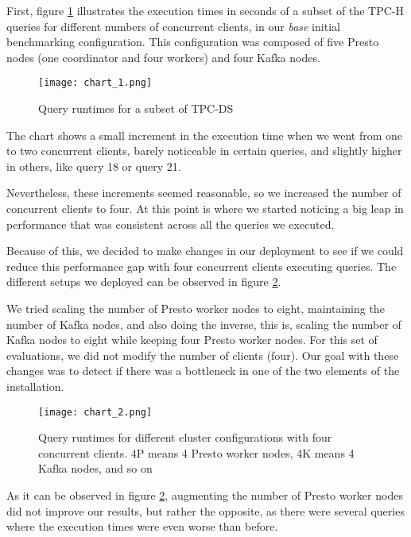 \documentclass[conference]{IEEEtran}
\begin{document}
First, figure \ref{chart_1} illustrates the execution times in seconds of a subset of the TPC-H queries for different numbers of concurrent clients, in our \textit{base} initial benchmarking configuration. This configuration was composed of five Presto nodes (one coordinator and four workers) and four Kafka nodes.

\begin{figure}[htbp]
\centerline{\texttt{[image: chart\_1.png]}}
\caption{Query runtimes for a subset of TPC-DS}
\label{chart_1}
\end{figure}

The chart shows a small increment in the execution time when we went from one to two concurrent clients, barely noticeable in certain queries, and slightly higher in others, like query 18 or query 21.

Nevertheless, these increments seemed reasonable, so we increased the number of concurrent clients to four. At this point is where we started noticing a big leap in performance that was consistent across all the queries we executed.

Because of this, we decided to make changes in our deployment to see if we could reduce this performance gap with four concurrent clients executing queries. The different setups we deployed can be observed in figure \ref{chart_2}.

We tried scaling the number of Presto worker nodes to eight, maintaining the number of Kafka nodes, and also doing the inverse, this is, scaling the number of Kafka nodes to eight while keeping four Presto worker nodes. For this set of evaluations, we did not modify the number of clients (four). Our goal with these changes was to detect if there was a bottleneck in one of the two elements of the installation.

\begin{figure}[htbp]
\centerline{\texttt{[image: chart\_2.png]}}
\caption{Query runtimes for different cluster configurations with four concurrent clients. 4P means 4 Presto worker nodes, 4K means 4 Kafka nodes, and so on}
\label{chart_2}
\end{figure}

As it can be observed in figure \ref{chart_2}, augmenting the number of Presto worker nodes did not improve our results, but rather the opposite, as there were several queries where the execution times were even worse than before.
\end{document}
